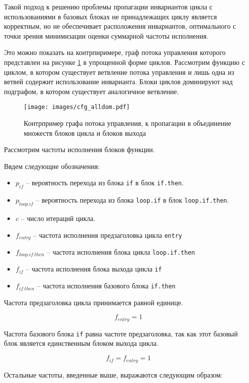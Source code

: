 Такой подход к решению проблемы пропагации инвариантов цикла с использованиями в базовых блоках не принадлежащих циклу является корректным, но не обеспечивает расположения инвариантов, оптимального с точки зрения минимизации оценки суммарной частоты исполнения.

Это можно показать на контрпиримере, граф потока управления которого представлен на рисунке \ref{fig:cfg_alldom} в упрощенной форме циклов.
Рассмотрим функцию с циклом, в котором существует ветвление потока управления и лишь одна из ветвей содержит использование инварианта.
Блоки циклов доминируют над подграфом, в котором существует аналогичное ветвление.

\begin{figure}
    \centering
    \texttt{[image: images/cfg\_alldom.pdf]}
    \caption{Контрпример графа потока управления, к пропагации в объединение множеств блоков цикла и блоков выхода}
    \label{fig:cfg_alldom}
\end{figure}

Рассмотрим частоты исполнения блоков функции.

Ввдем следующие обозначения:
\begin{itemize}
    \item $p_{if}$ -- вероятность перехода из блока \texttt{if} в блок \texttt{if.then}.
    \item $p_{loop.if}$ -- вероятность перехода из блока \texttt{loop.if} в блок \texttt{loop.if.then}.
    \item $c$ -- число итераций цикла.
    \item $f_{entry}$ -- частота исполнения предзаголовка цикла \texttt{entry}
    \item $f_{loop.if.then}$ -- частота исполнения блока цикла \texttt{loop.if.then}
    \item $f_{if}$ -- частота исполнения блока выхода цикла \texttt{if}
    \item $f_{if.then}$ -- частота исполнения базового блока \texttt{if.then}
\end{itemize}

Частота предзаголовка цикла принимается равной единице.

$$ f_{entry} = 1 $$

Частота базового блока \texttt{if} равна частоте предзаголовка, так как этот базовый блок является единственным блоком выхода цикла.

$$ f_{if} = f_{entry} = 1 $$

Остальные частоты, введенные выше, выражаются следующим образом:

